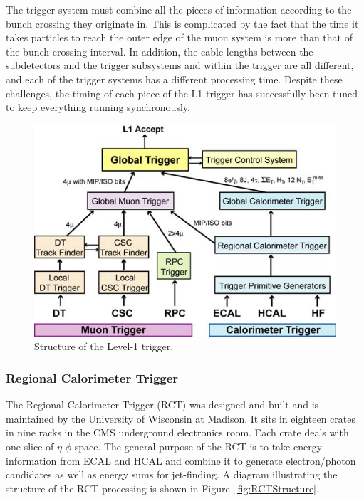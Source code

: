 The trigger system must combine all the pieces of information 
according to the bunch crossing they originate in.   
This is complicated by the fact that the time it takes particles 
to reach the outer edge of the muon system 
is 
more than %
that of the bunch crossing interval.  
In addition, the cable lengths between the subdetectors 
and the trigger subsystems and within the trigger are 
all different, 
and each of the trigger systems has a different processing time.  
Despite these challenges, the timing of each piece of 
the L1 trigger has successfully been tuned to keep everything running 
synchronously.  



 \begin{figure}[htb]
  \begin{center}
    \includegraphics[width=360pt]{Figures/L1structure.png}
  \end{center}
  \caption[\fixspacing Structure of the Level-1 trigger]
	  {\fixspacing Structure of the Level-1 trigger.}
  \label{fig:L1Structure}
 \end{figure}

\subsubsection{Regional Calorimeter Trigger}
\label{exp:RCT}
The Regional Calorimeter Trigger (RCT) \cite{rctTriggerSystem}
was designed and built and is maintained 
by the University of Wisconsin at Madison.  
It sits in eighteen crates in nine racks in the CMS underground electronics room.  
Each crate deals with one slice of $\eta$-$\phi$ space.  
The general purpose of the RCT is to take 
energy information from ECAL and HCAL and combine it 
to generate electron/photon candidates as well as energy sums for 
jet-finding.  
A diagram illustrating the structure of the RCT processing 
is shown in Figure~\ref{fig:RCTStructure}.  

